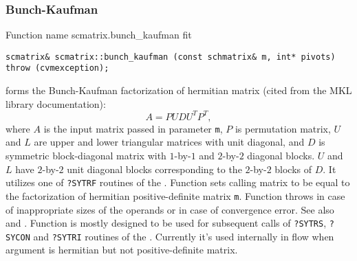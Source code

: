 \subsubsection{Bunch-Kaufman}
Function%
\pdfdest name {scmatrix.bunch_kaufman} fit
\begin{verbatim}
scmatrix& scmatrix::bunch_kaufman (const schmatrix& m, int* pivots)
throw (cvmexception);
\end{verbatim}
forms the Bunch-Kaufman factorization of  hermitian matrix 
(cited from the MKL library documentation):
\begin{equation*}
A=PUDU^TP^T,
\end{equation*}
where $A$ is the input matrix passed in parameter \verb"m",
$P$ is  permutation matrix, $U$ and $L$ are upper and lower triangular
matrices with unit diagonal, and $D$ is  symmetric 
block-diagonal matrix with $1$-by-$1$ and $2$-by-$2$
diagonal blocks. $U$ and $L$ have $2$-by-$2$ unit diagonal 
blocks corresponding to the $2$-by-$2$ blocks of $D$.
It utilizes one of \verb"?SYTRF" routines of the
.
Function
sets  calling matrix to be equal to the factorization
of  hermitian
positive-definite matrix \verb"m".
Function throws 
in case of inappropriate sizes of the operands
or in case of convergence error.
See also
 and
.
Function is mostly designed to be used for subsequent calls
of \verb"?SYTRS", \verb"?SYCON" and \verb"?SYTRI" routines of the
.
Currently it's used internally in  flow
when argument is hermitian but not positive-definite matrix.
\newpage


